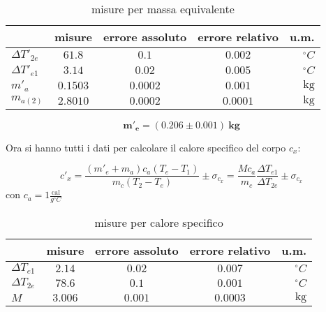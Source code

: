 \documentclass{article}
\begin{document}
	\begin{table}[H] \centering
		\begin{small}
			\begin{tabular}{@{}lcccr@{}}\toprule
				&  	\textbf{misure}	& \textbf{errore assoluto} & \textbf{errore relativo}  & u.m.\\ \midrule
				\(\Delta T'_{2e}\)	&  \(61.8\)	& \(0.1\)	& \(0.002\)	&\(^\circ C\)			\\  \hdashline
				\(\Delta T'_{e1}\)	&  \(3.14\)	& \(0.02\)	& \(0.005\)	&\(^\circ C\)			\\  \hdashline
				\(m'_{a}\)			&  \(0.1503\)	& \(0.0002\)	& \(0.001\)	&\(\SI{}{\kilogram}\) 	 \\  \hdashline
				\(m_{a(2)}\)		    &  \(2.8010\)    & \(0.0002\)	& \(0.0001\)	&\(\SI{}{\kilogram}\) 	\\ \bottomrule
			\end{tabular}
			\caption{misure per massa equivalente}
			\label{table:Tabella massa eqiuivalente 2}
		\end{small}
	\end{table}
	
	
	\[ 
	\boxed{\boldsymbol{m'_{e} = (0.206 \pm 0.001)\SI{}{\kilogram}}}
	\]
	
	\noindent
	Ora si hanno tutti i dati per calcolare il calore specifico del corpo \(c_{x}\):
	
	\[ 
	c'_{x} = \frac{(m'_{e} + m_{a})c_{a}(T_{e} - T_{1})}{m_{c}(T_{2}-T_{e})} \pm \sigma_{c_x} = \frac{Mc_{a}}{m_{c}}\frac{\Delta T_{e1}}{\Delta T_{2e}}\pm \sigma_{c_x} 
	\]
	con \(c_{a} = 1 \frac{\text{cal}}{g ^\circ C}\)
	\begin{table}[H] \centering
		\begin{small}
			\begin{tabular}{@{}lcccr@{}}\toprule
				&  	\textbf{misure}	& \textbf{errore assoluto} & \textbf{errore relativo}  & u.m.\\ \midrule
				\(\Delta T_{e1}\)	&  \(2.14\)	& \(0.02\)	& \(0.007\)	&\(^\circ C\)			\\  \hdashline
				\(\Delta T_{2e}\)	&  \(78.6\)	& \(0.1\)	& \(0.001\)	&\(^\circ C\)			\\  \hdashline
				\(M\)		    &  \(3.006\)    & \(0.001\)	& \(0.0003\)	&\(\SI{}{\kilogram}\) 	\\  \bottomrule
			\end{tabular}
			\caption{misure per calore specifico}
			\label{table:Tabella calore specifico 2}
		\end{small}
	\end{table}
	
\end{document}
